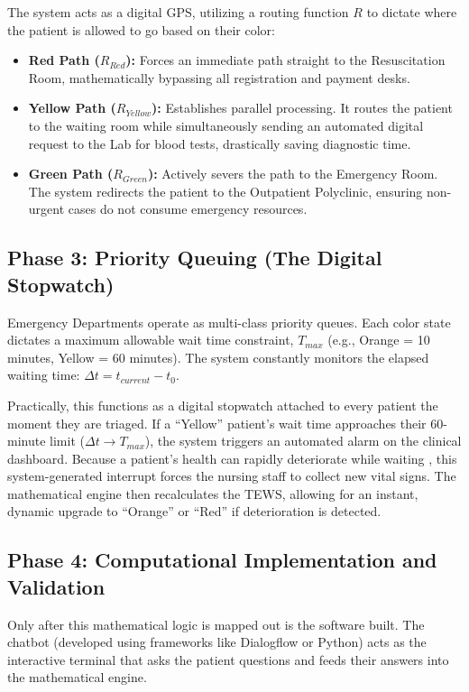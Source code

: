 \documentclass[12pt, a4paper]{article}
\begin{document}
	The system acts as a digital GPS, utilizing a routing function $R$ to dictate where the patient is allowed to go based on their color:
	\begin{itemize}
		\item \textbf{Red Path ($R_{Red}$):} Forces an immediate path straight to the Resuscitation Room, mathematically bypassing all registration and payment desks.
		\item \textbf{Yellow Path ($R_{Yellow}$):} Establishes parallel processing. It routes the patient to the waiting room while simultaneously sending an automated digital request to the Lab for blood tests, drastically saving diagnostic time.
		\item \textbf{Green Path ($R_{Green}$):} Actively severs the path to the Emergency Room. The system redirects the patient to the Outpatient Polyclinic, ensuring non-urgent cases do not consume emergency resources.
	\end{itemize}
	
	\subsection*{Phase 3: Priority Queuing (The Digital Stopwatch)}
	Emergency Departments operate as multi-class priority queues. Each color state dictates a maximum allowable wait time constraint, $T_{max}$ (e.g., Orange = 10 minutes, Yellow = 60 minutes). The system constantly monitors the elapsed waiting time: $\Delta t = t_{current} - t_0$. 
	
	Practically, this functions as a digital stopwatch attached to every patient the moment they are triaged. If a ``Yellow'' patient's wait time approaches their 60-minute limit ($\Delta t \to T_{max}$), the system triggers an automated alarm on the clinical dashboard. Because a patient's health can rapidly deteriorate while waiting \cite{nurchis2025}, this system-generated interrupt forces the nursing staff to collect new vital signs. The mathematical engine then recalculates the TEWS, allowing for an instant, dynamic upgrade to ``Orange'' or ``Red'' if deterioration is detected.
	
	\subsection*{Phase 4: Computational Implementation and Validation}
	Only after this mathematical logic is mapped out is the software built. The chatbot (developed using frameworks like Dialogflow or Python) acts as the interactive terminal that asks the patient questions and feeds their answers into the mathematical engine. 
	
\end{document}
